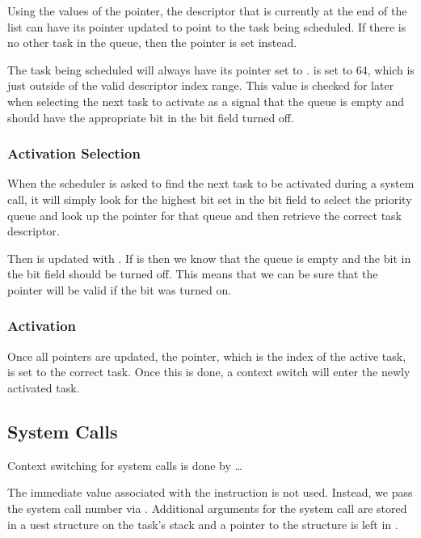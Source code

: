 \documentclass[pdftex,10pt,a4paper]{article}
\begin{document}
Using the values of the  pointer, the descriptor that is
currently at the end of the list can have its  pointer
updated to point to the task being scheduled. If there is no other
task in the queue, then the  pointer is set instead.

The task being scheduled will always have its  pointer set
to .  is set to 64, which is just
outside of the valid descriptor index range. This value is checked for
later when selecting the next task to activate as a signal that the
queue is empty and should have the appropriate bit in the bit field
turned off.

\subsubsection*{Activation Selection}

When the scheduler is asked to find the next task to be activated
during a system call, it will simply look for the highest bit set in
the bit field to select the priority queue and look up the 
pointer for that queue and then retrieve the correct task descriptor.

Then  is updated with . If 
is  then we know that the queue is empty and the bit
in the bit field should be turned off. This means that we can be sure
that the  pointer will be valid if the bit was turned on.

\subsubsection*{Activation}

Once all pointers are updated, the  pointer, which
is the index of the active task, is set to the correct task. Once this
is done, a context switch will enter the newly activated task.

\subsection*{System Calls}

Context switching for system calls is done by \ldots

The immediate value associated with the  instruction is not
used. Instead, we pass the system call number via . Additional
arguments for the system call are stored in a uest
structure on the task's stack and a pointer to the structure is left
in .
\end{document}
